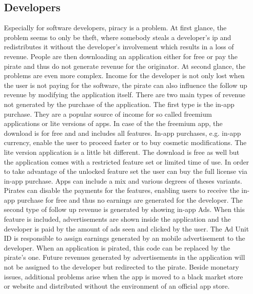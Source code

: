 \subsection{Developers} \label{subsection:foundation-piracy-developers}
Especially for software developers, piracy is a problem.
At first glance, the problem seems to only be theft, where somebody steals a developer's \gls{ip} and redistributes it without the developer’s involvement which results in a loss of revenue.
People are then downloading an application either for free or pay the pirate and thus do not generate revenue for the originator.
\newline
At second glance, the problems are even more complex.
Income for the developer is not only lost when the user is not paying for the software, the pirate can also influence the follow up revenue by modifying the application itself.
There are two main types of revenue not generated by the purchase of the application.
The first type is the in-app purchase.
They are a popular source of income for so called freemium applications or lite versions of apps.
In case of the the freemium app, the download is for free and and includes all features. In-app purchases, e.g. in-app currency, enable the user to proceed faster or to buy cosmetic modifications.
The lite version application is a little bit different. The download is free as well but the application comes with a restricted feature set or limited time of use.
In order to take advantage of the unlocked feature set the user can buy the full license via in-app purchase.
Apps can include a mix and various degrees of theses variants.
Pirates can disable the payments for the features, enabling users to receive the in-app purchase for free and thus no earnings are generated for the developer.
\newline
The second type of follow up revenue is generated by showing in-app Ads.
When this feature is included, advertisements are shown inside the application and the developer is paid by the amount of ads seen and clicked by the user.
The Ad Unit ID \cite{googleAdmob} is responsible to assign earnings generated by an mobile advertisement to the developer.
When an application is pirated, this code can be replaced by the pirate's one. Future revenues generated by advertisements in the application will not be assigned to the developer but redirected to the pirate.
\newline
\newline
Beside monetary issues, additional problems arise when the app is moved to a black market store or website  and distributed without the environment of an official app store.
